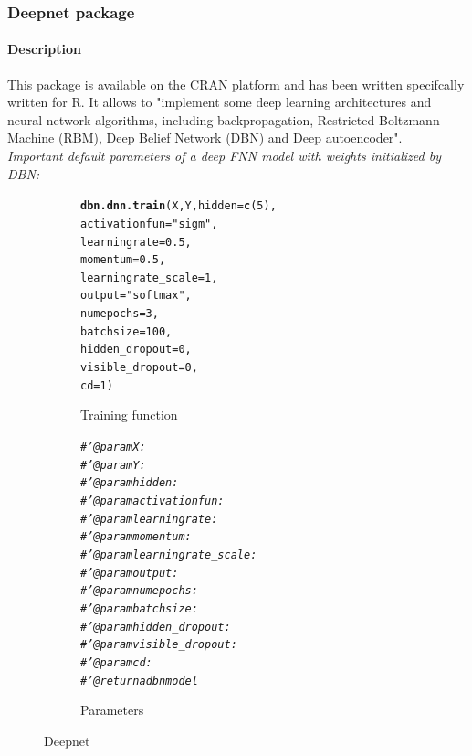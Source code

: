 \documentclass[letter]{article}\usepackage[]{graphicx}\usepackage[]{color}
\makeatletter
\newcommand{\hlnum}[1]{\textcolor[rgb]{0.686,0.059,0.569}{#1}}%
\newcommand{\hlstr}[1]{\textcolor[rgb]{0.192,0.494,0.8}{#1}}%
\newcommand{\hlcom}[1]{\textcolor[rgb]{0.678,0.584,0.686}{\textit{#1}}}%
\newcommand{\hlstd}[1]{\textcolor[rgb]{0.345,0.345,0.345}{#1}}%
\newcommand{\hlkwc}[1]{\textcolor[rgb]{0.333,0.667,0.333}{#1}}%
\newcommand{\hlkwd}[1]{\textcolor[rgb]{0.737,0.353,0.396}{\textbf{#1}}}%
\newenvironment{kframe}{%
 \def\at@end@of@kframe{}%
 \ifinner\ifhmode%
  \def\at@end@of@kframe{\end{minipage}}%
  \begin{minipage}{\columnwidth}%
 \fi\fi%
 \def\FrameCommand##1{\hskip\@totalleftmargin \hskip-\fboxsep
 \colorbox{shadecolor}{##1}\hskip-\fboxsep
     \hskip-\linewidth \hskip-\@totalleftmargin \hskip\columnwidth}%
 \MakeFramed {\advance\hsize-\width
   \@totalleftmargin\z@ \linewidth\hsize
   \@setminipage}}%
 {\par\unskip\endMakeFramed%
 \at@end@of@kframe}
\newenvironment{knitrout}{}{} %
\makeatother
\begin{document}
\subsubsection{Deepnet package}
\paragraph{Description}
This package is available on the CRAN platform and has been written specifcally written for R. It allows to "implement some deep learning architectures and neural network algorithms, including backpropagation, Restricted Boltzmann Machine (RBM), Deep Belief Network (DBN) and Deep autoencoder".\\
\textit{Important default parameters of a deep FNN model with weights initialized by DBN:}
\begin{figure}[H]
  \begin{subfigure}{0.5\textwidth}
\begin{knitrout}
\color{fgcolor}\begin{kframe}
\begin{alltt}
\hlkwd{dbn.dnn.train}\hlstd{(X, Y,} \hlkwc{hidden}\hlstd{=}\hlkwd{c}\hlstd{(}\hlnum{5}\hlstd{),}
              \hlkwc{activationfun}\hlstd{=}\hlstr{"sigm"}\hlstd{,}
              \hlkwc{learningrate}\hlstd{=}\hlnum{0.5}\hlstd{,}
              \hlkwc{momentum}\hlstd{=}\hlnum{0.5}\hlstd{,}
              \hlkwc{learningrate_scale}\hlstd{=}\hlnum{1}\hlstd{,}
              \hlkwc{output}\hlstd{=}\hlstr{"softmax"}\hlstd{,}
              \hlkwc{numepochs} \hlstd{=} \hlnum{3}\hlstd{,}
              \hlkwc{batchsize} \hlstd{=} \hlnum{100}\hlstd{,}
              \hlkwc{hidden_dropout} \hlstd{=} \hlnum{0}\hlstd{,}
              \hlkwc{visible_dropout} \hlstd{=} \hlnum{0}\hlstd{,}
              \hlkwc{cd} \hlstd{=} \hlnum{1}\hlstd{)}
\end{alltt}
\end{kframe}
\end{knitrout}
    \caption{Training function}
  \end{subfigure}
  \begin{subfigure}{0.5\textwidth}
    \centering
\begin{knitrout}
\color{fgcolor}\begin{kframe}
\begin{alltt}
\hlcom{#' @param X :}
\hlcom{#' @param Y :}
\hlcom{#' @param hidden :}
\hlcom{#' @param activationfun : }
\hlcom{#' @param learningrate :}
\hlcom{#' @param momentum :}
\hlcom{#' @param learningrate_scale :}
\hlcom{#' @param output :}
\hlcom{#' @param numepochs :}
\hlcom{#' @param batchsize :}
\hlcom{#' @param hidden_dropout :}
\hlcom{#' @param visible_dropout :}
\hlcom{#' @param cd :}
\hlcom{#' @return a dbn model}
\end{alltt}
\end{kframe}
\end{knitrout}
    \caption{Parameters}
  \end{subfigure}
    \caption{Deepnet}
\end{figure}
\end{document}

